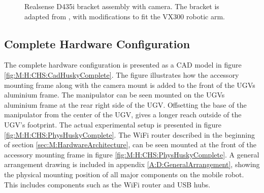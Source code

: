 \begin{figure}[htp!]
\begin{minipage}[b]{0.49\textwidth}
    \caption{Realsense D435i bracket assembly with camera. The bracket is adapted from \cite{d435_sleeve}, with modifications to fit the VX300 robotic arm.}
    \label{fig:realsense_assembly}
  \end{minipage}
\end{figure}


\subsection{Complete Hardware Configuration} \label{sec:M:CompleteHWConfig}
The complete hardware configuration is presented as a CAD model in figure \ref{fig:M:H:CHS:CadHuskyComplete}. The figure illustrates how the accessory mounting frame along with the camera mount is added to the front of the UGVs aluminium frame. The manipulator can be seen mounted on the UGVs aluminium frame at the rear right side of the UGV. Offsetting the base of the manipulator from the center of the UGV, gives a longer reach outside of the UGV's footprint. The actual experimental setup is presented in figure \ref{fig:M:H:CHS:PhysHuskyComplete}. The WiFi router described in the beginning of section \ref{sec:M:HardwareArchitecture}, can be seen mounted at the front of the accessory mounting frame in figure \ref{fig:M:H:CHS:PhysHuskyComplete}. A general arrangement drawing is included in appendix \ref{A:D:GeneralArrangement}, showing the physical mounting position of all major components on the mobile robot. This includes components such as the WiFi router and USB hubs.

